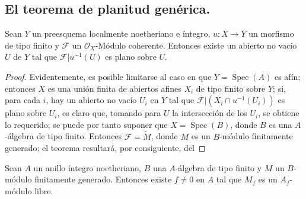 \subsection{El teorema de planitud genérica.}
\label{subsection:IV.6.9}

\begin{theorem}[6.9.1]
\label{IV.2.s6.9.1-fr}
Sean $Y$ un preesquema localmente noetheriano e íntegro, $u:X\to Y$ un
morfismo de tipo finito y $\mathcal F$ un $\mathcal O_X$-Módulo coherente. Entonces
existe un abierto no vacío $U$ de $Y$ tal que
$\mathcal F|u^{-1}(U)$ es plano sobre $U$.
\end{theorem}

\begin{proof}
Evidentemente, es posible limitarse al caso en que $Y=\operatorname{Spec}(A)$ es afín;
entonces $X$ es una unión finita de abiertos afines $X_i$ de tipo finito sobre $Y$; si,
para cada $i$, hay un abierto no vacío $U_i$ en $Y$ tal que
$\mathcal F|(X_i\cap u^{-1}(U_i))$ es plano sobre $U_i$, es claro que,
tomando para $U$ la intersección de los $U_i$, se obtiene lo requerido; se puede
por tanto suponer que $X=\operatorname{Spec}(B)$, donde $B$ es una $A$-álgebra de
tipo finito. Entonces $\mathcal F=\widetilde M$, donde $M$ es un $B$-módulo
finitamente generado; el teorema resultará, por consiguiente, del
\end{proof}

\begin{lemma}[6.9.2]
\label{IV.2.s6.9.2-fr}
Sean $A$ un anillo íntegro noetheriano, $B$ una $A$-álgebra de tipo finito y
$M$ un $B$-módulo finitamente generado. Entonces existe $f\ne0$ en $A$ tal que
$M_f$ es un $A_f$-módulo libre.
\end{lemma}

